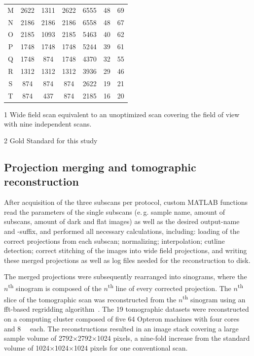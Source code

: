 \begin{threeparttable}
\begin{tabular}{ccccccc}
		M & 2622 & 1311 & 2622 & 6555  &  48 & 69\\
		N & 2186 & 2186 & 2186 & 6558  &  48 & 67\\
		O & 2185 & 1093 & 2185 & 5463  &  40 & 62\\
		P & 1748 & 1748 & 1748 & 5244  &  39 & 61\\
		Q & 1748 & 874  & 1748 & 4370  &  32 & 55\\
		R & 1312 & 1312 & 1312 & 3936  &  29 & 46\\
		S & 874  & 874  & 874  & 2622  &  19 & 21\\
		\rowcolor{lightgray} T & 874  & 437  & 874  & 2185  &  16  & 20\\
		\bottomrule
	\end{tabular}
	\begin{tablenotes}
		\footnotesize
		\item[1] Wide field scan equivalent to an unoptimized scan covering the field of view with nine independent scans.
		\item[2] Gold Standard for this study
	\end{tablenotes}

\end{threeparttable}

\subsection{Projection merging and tomographic reconstruction}
After acquisition of the three subscans per protocol, custom MATLAB functions read the parameters of the single subscans (e.\,g. sample name, amount of subscans, amount of dark and flat images) as well as the desired output-name and -suffix, and performed all necessary calculations, including: loading of the correct projections from each subscan; normalizing; interpolation; cutline detection; correct stitching of the images into wide field projections, and writing these merged projections as well as log files needed for the reconstruction to disk.

The merged projections were subsequently rearranged into sinograms, where the $n$\textsuperscript{th} sinogram is composed of the $n$\textsuperscript{th} line of every corrected projection. The $n$\textsuperscript{th} slice of the tomographic scan was reconstructed from the $n$\textsuperscript{th} sinogram using an \acs{fft}-based regridding algorithm~\cite{Dowd1999,Marone2008}. The 19 tomographic datasets were reconstructed on a computing cluster composed of five \SI{64}{\bit} Opteron machines with four cores and \SI{8}{\giga\byte}  each. The reconstructions resulted in an image stack covering a large sample volume of 2792$\times$2792$\times$1024 pixels, a nine-fold increase from the standard volume of 1024$\times$1024$\times$1024 pixels for one conventional scan.


